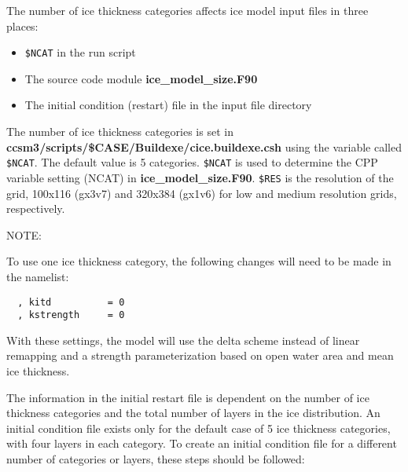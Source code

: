 
The number of ice thickness categories affects ice model input files in three
places:
  \begin{itemize}
    \item {\tt \$NCAT} in the run script
    \item The source code module {\bf ice\_model\_size.F90}
    \item The initial condition (restart) file in the input file directory
  \end{itemize}

The number of ice thickness categories is set in 
{\bf ccsm3/scripts/\$CASE/Buildexe/cice.buildexe.csh} using the variable 
called {\tt \$NCAT}.  The default value is 5 categories. {\tt \$NCAT} is 
used to determine the CPP variable setting (NCAT) in 
{\bf ice\_model\_size.F90}. {\tt \$RES} is the resolution of the grid, 
100x116 (gx3v7) and 320x384 (gx1v6) for low and medium resolution grids, 
respectively.

\begin{Ventry}{NOTE:}
\item[NOTE]
To use one ice thickness category, the following changes will need to be
made in the namelist: \\

\begin{verbatim}
  , kitd          = 0
  , kstrength     = 0
\end{verbatim}

With these settings, the model will use the delta scheme instead of linear
remapping and a strength parameterization based on open water area and
mean ice thickness.

\end{Ventry}

The information in the initial restart file is dependent on the number of
ice thickness categories and the total number of layers in the ice distribution.
An initial condition file exists only for the default case of 5 ice thickness
categories, with four layers in each category. To create an initial condition
file for a different number of categories or layers, these steps should be 
followed:

